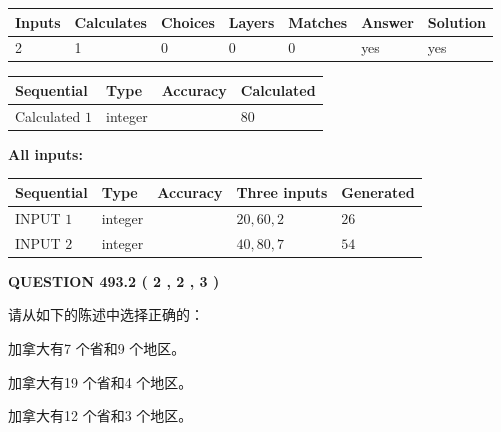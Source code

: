 \documentclass{ctexart}
\begin{document}
   
\noindent\begin{tabular}{|l|l|l|l|l|l|l|}
 \hline
Inputs & Calculates & Choices & Layers & Matches & Answer & Solution \\ \hline
 2  & 
 1  & 
 0
  & 
 0  & 
 0  & 
  yes & 
  yes 
  \\ \hline
 \end{tabular}
   
   
   
   
\noindent{}
   
   
  
  
\noindent\begin{tabular}{|l|l|l|l|}
\hline
 Sequential & Type & Accuracy & Calculated \\ 
\hline
 
 
  Calculated $  1 $ & integer &  & 
  $ 80 $ 
 \\  \hline  
 \end{tabular}
   
   
   
   
\noindent\vspace{0.1in}\hspace{-0.08in} {\textbf{\Large{All inputs: }}}
   
   
  
  
\noindent\begin{tabular}{|l|l|l|l|l|}
\hline
 Sequential & Type & Accuracy & Three inputs & Generated \\ 
\hline
 
 
  INPUT $  1 $ & integer &  & $
 20
 , 
 60
 , 
 2
 $ & $ 26 $ 
 \\  \hline  
 
 
  INPUT $  2 $ & integer &  & $
 40
 , 
 80
 , 
 7
 $ & $ 54 $ 
 \\  \hline  
 \end{tabular}
   
   
  
\vspace{0.2in}
  
{\textbf{\Large{QUESTION
493.2 
 ( 2 , 2 , 3 )
}}}
  
  
请从如下的陈述中选择正确的：
 
 
加拿大有7 个省和9 个地区。
 
 
加拿大有19 个省和4 个地区。
 
 
加拿大有12 个省和3 个地区。
 
\end{document}
